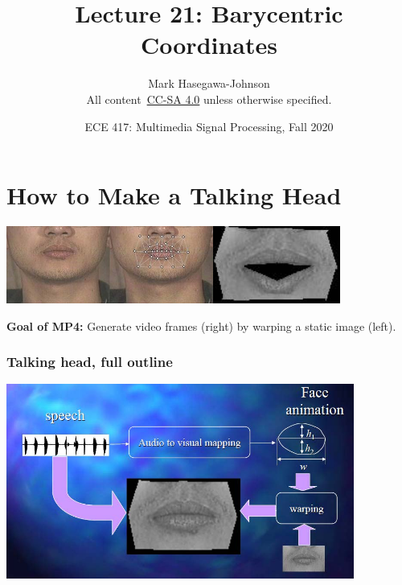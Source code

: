 \documentclass{beamer}
\title{Lecture 21: Barycentric Coordinates}
\author{Mark Hasegawa-Johnson\\All content~\href{https://creativecommons.org/licenses/by-sa/4.0/}{CC-SA 4.0} unless otherwise specified.}
\date{ECE 417: Multimedia Signal Processing, Fall 2020}
\institute{University of Illinois}
\begin{document}
\begin{frame}
  \maketitle
\end{frame}

\begin{frame}
  \tableofcontents
\end{frame}

\section{How to Make a Talking Head}
\setcounter{subsection}{1}

\begin{frame}
  \centerline{\includegraphics[height=1in]{mp7_image_warping_points.jpg}\includegraphics[height=1in]{mp7_image_warped.jpg}}
  {\bf Goal of MP4:} Generate video frames (right) by warping a static image (left).
\end{frame}

\begin{frame}
  \frametitle{Talking head, full outline}
  \centerline{\includegraphics[width=4.5in]{mp7_image_warping.jpg}}
\end{frame}
\end{document}
